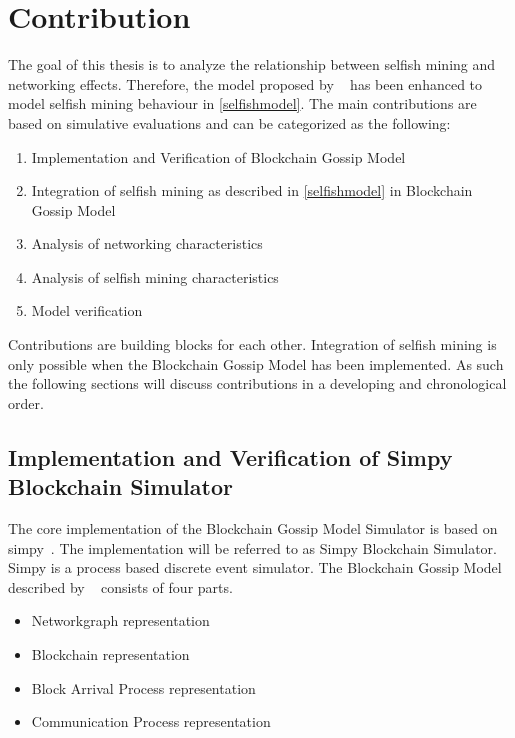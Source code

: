 
\chapter{Contribution}\label{chap:contribution}
The goal of this thesis is to analyze the relationship between selfish mining and networking effects. Therefore, the model proposed by \gopalan~ has been enhanced to model selfish mining behaviour in \ref{selfishmodel}. The main contributions are based on simulative evaluations and can be categorized as the following:
\begin{enumerate}
	\item Implementation and Verification of Blockchain Gossip Model~\cite{gopalan}
	\item Integration of selfish mining as described in \ref{selfishmodel} in Blockchain Gossip Model 
	\item Analysis of networking characteristics
	\item Analysis of selfish mining characteristics
	\item Model verification
\end{enumerate}
Contributions are building blocks for each other. Integration of selfish mining is only possible when the Blockchain Gossip Model has been implemented.
As such the following sections will discuss contributions in a developing and chronological order.

\section{Implementation and Verification of Simpy Blockchain Simulator}

The core implementation of the Blockchain Gossip Model Simulator is based on simpy~\cite{simpy}. The implementation will be referred to as Simpy Blockchain Simulator. Simpy is a process based discrete event simulator. The Blockchain Gossip Model described by \citeauthor{gopalan}~\cite{gopalan} consists of four parts. 
\begin{itemize}
\item Networkgraph representation
\item Blockchain representation
\item Block Arrival Process representation
\item Communication Process representation
\end{itemize}
